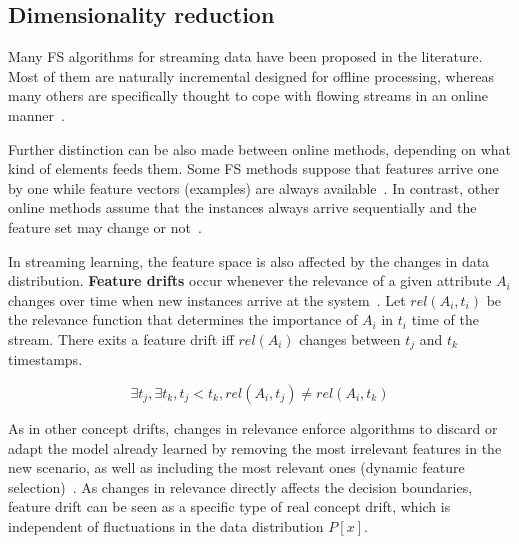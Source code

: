 \documentclass[preprint,12pt]{elsarticle}
\begin{document}
\subsection{Dimensionality reduction}
\label{subsec:dimred}

Many FS algorithms for streaming data have been proposed in the literature. Most of them are naturally incremental designed for offline processing, whereas many others are specifically thought to cope with flowing streams in an online manner~\cite{bolon15}. 

Further distinction can be also made between online methods, depending on what kind of elements feeds them. Some FS methods suppose that features arrive one by one while feature vectors (examples) are always available~\citep{wu10, eskandari16}. In contrast, other online methods assume that the instances always arrive sequentially and the feature set may change or not~\cite{kata05}. 

In streaming learning, the feature space is also affected by the changes in data distribution. \textbf{Feature drifts} occur whenever the relevance of a given attribute $A_i$ changes over time when new instances arrive at the system~\cite{barddal15}. Let $rel(A_i, t_i)$ be the relevance function that determines the importance of $A_i$ in $t_i$ time of the stream. There exits a feature drift iff $rel(A_i)$ changes between $t_j$ and $t_k$ timestamps.

\begin{equation}\label{eq:rel}
\exists t_j, \exists t_k, t_j < t_k, rel(A_i, t_j) \neq rel(A_i, t_k)
\end{equation}

As in other concept drifts, changes in relevance enforce algorithms to discard or adapt the model already learned by removing the most irrelevant features in the new scenario, as well as including the most relevant ones (dynamic feature selection)~\cite{nguyen12}. As changes in relevance directly affects the decision boundaries, feature drift can be seen as a specific type of real concept drift, which is independent of fluctuations in the data distribution $P[x]$. 
\end{document}
